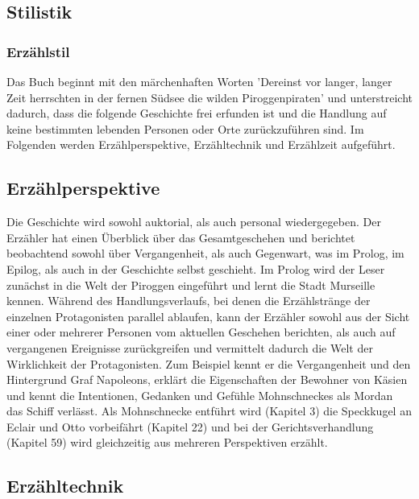 \subsection{Stilistik}

\subsubsection{Erzählstil}


Das Buch beginnt mit den märchenhaften Worten 'Dereinst vor langer, langer Zeit herrschten in der fernen Südsee die wilden Piroggenpiraten'\cite[S.7]{pir} und unterstreicht dadurch, dass die folgende Geschichte frei erfunden ist und die Handlung auf keine bestimmten lebenden Personen oder Orte zurückzuführen sind. 
Im Folgenden werden Erzählperspektive, Erzähltechnik und Erzählzeit aufgeführt.

\subsection{Erzählperspektive}

Die Geschichte wird sowohl auktorial, als auch personal wiedergegeben. Der Erzähler hat einen Überblick über das Gesamtgeschehen und berichtet  beobachtend sowohl über Vergangenheit, als auch Gegenwart, was im Prolog, im Epilog, als auch in der Geschichte selbst geschieht. 
Im Prolog wird der Leser zunächst in die Welt der Piroggen eingeführt und lernt die Stadt Murseille kennen. Während des Handlungsverlaufs, bei denen die Erzählstränge der einzelnen Protagonisten parallel ablaufen, kann der Erzähler sowohl aus der Sicht einer oder mehrerer Personen vom aktuellen Geschehen berichten, als auch auf vergangenen Ereignisse zurückgreifen und vermittelt dadurch die Welt der Wirklichkeit der Protagonisten. Zum Beispiel kennt er die Vergangenheit und den Hintergrund Graf Napoleons, \cite[S.17f]{pir} erklärt die Eigenschaften der Bewohner von Käsien \cite[S.140f]{pir} und kennt die Intentionen, Gedanken und Gefühle Mohnschneckes als Mordan das Schiff verlässt.\cite[S.374]{pir} Als Mohnschnecke entführt wird (Kapitel 3) die Speckkugel an Eclair und Otto vorbeifährt (Kapitel 22) und bei der Gerichtsverhandlung (Kapitel 59) wird gleichzeitig aus mehreren Perspektiven erzählt.



\subsection{Erzähltechnik}

